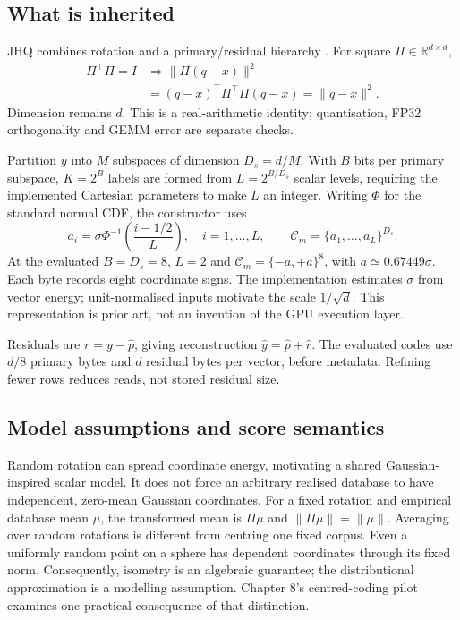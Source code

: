 \subsection{What is inherited}

JHQ combines rotation and a primary/residual hierarchy \cite{jhq}. For square $\Pi\in\mathbb R^{d\times d}$,
\begin{equation}
 \begin{aligned}
 \Pi^\top\Pi=I
 &\Longrightarrow
 \|\Pi(q-x)\|^2\\
 &=(q-x)^\top\Pi^\top\Pi(q-x)=\|q-x\|^2.
 \end{aligned}
 \label{eq:2-isometry}
\end{equation}
Dimension remains $d$. This is a real-arithmetic identity; quantisation, FP32 orthogonality and GEMM error are separate checks.

Partition $y$ into $M$ subspaces of dimension $D_s=d/M$. With $B$ bits per
primary subspace, $K=2^B$ labels are formed from $L=2^{B/D_s}$ scalar levels,
requiring the implemented Cartesian parameters to make $L$ an integer.
Writing $\Phi$ for the standard normal CDF, the constructor uses
\begin{equation}
 a_i=\sigma\Phi^{-1}\!\left(\frac{i-1/2}{L}\right),\quad
 i=1,\ldots,L,\qquad
 \mathcal C_m=\{a_1,\ldots,a_L\}^{D_s}.
 \label{eq:2-cartesian}
\end{equation}
At the evaluated $B=D_s=8$, $L=2$ and $\mathcal C_m=\{-a,+a\}^8$,
with $a\simeq0.67449\sigma$. Each byte records eight coordinate signs.
The implementation estimates $\sigma$ from vector energy; unit-normalised
inputs motivate the scale $1/\sqrt d$. This representation is prior art,
not an invention of the GPU execution layer.

Residuals are $r=y-\widehat p$, giving reconstruction $\widehat y=\widehat p+\widehat r$. The evaluated codes use $d/8$ primary bytes and $d$ residual bytes per vector, before metadata. Refining fewer rows reduces reads, not stored residual size.

\subsection{Model assumptions and score semantics}

Random rotation can spread coordinate energy, motivating a shared
Gaussian-inspired scalar model. It does not force an arbitrary realised
database to have independent, zero-mean Gaussian coordinates. For a fixed
rotation and empirical database mean $\mu$, the transformed mean is
$\Pi\mu$ and $\|\Pi\mu\|=\|\mu\|$. Averaging over random rotations is
different from centring one fixed corpus. Even a uniformly random point on
a sphere has dependent coordinates through its fixed norm. Consequently,
isometry is an algebraic guarantee; the distributional approximation is a
modelling assumption. Chapter 8's centred-coding pilot examines one practical
consequence of that distinction.

